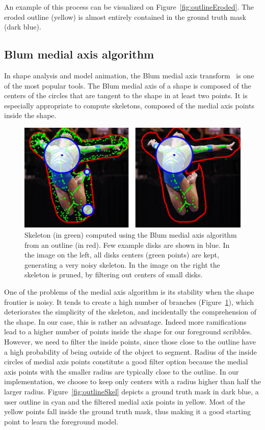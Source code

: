 An example of this process can be visualized
on Figure~\ref{fig:outlineEroded}.
The eroded outline (yellow) is almost entirely contained
in the ground truth mask (dark blue).


\subsection{Blum medial axis algorithm}


In shape analysis and model animation, the Blum medial axis
transform~\cite{blum1978shape} is one of the most popular tools.
The Blum medial axis of a shape is composed of the centers
of the circles that are tangent to the shape in at least two points.
It is especially appropriate to compute skeletons,
composed of the medial axis points inside the shape.


\begin{figure}[ht]
\includegraphics[width=\columnwidth]{assets/img/skeleton.jpg}
\caption{Skeleton (in green) computed using the Blum medial
axis algorithm from an outline (in red).
Few example disks are shown in blue.
In the image on the left, all disks centers (green points) are kept,
generating a very noisy skeleton.
In the image on the right the skeleton is pruned,
by filtering out centers of small disks.}%
\label{fig:skeleton}
\end{figure}


One of the problems of the medial axis algorithm is its stability
when the shape frontier is noisy.
It tends to create a high number of branches
(Figure~\ref{fig:skeleton}),
which deteriorates the simplicity of the skeleton,
and incidentally the comprehension of the shape.
In our case, this is rather an advantage.
Indeed more ramifications lead to a higher number of points
inside the shape for our foreground scribbles.
However, we need to filter the inside points,
since those close to the outline have a high probability
of being outside of the object to segment.
Radius of the inside circles of medial axis points
constitute a good filter option
because the medial axis points with the smaller radius are typically
close to the outline.
In our implementation, we choose to keep only centers
with a radius higher than half the larger radius.
Figure~\ref{fig:outlineSkel} depicts a ground truth mask in dark blue,
a user outline in cyan and the filtered medial axis points in yellow.
Most of the yellow points fall inside the ground truth mask,
thus making it a good starting point to learn the foreground model.


